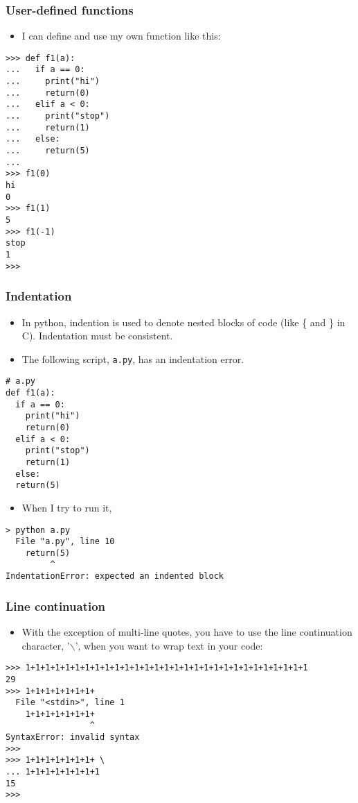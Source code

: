 \documentclass[handout]{beamer}
\numberwithin{equation}{section}
\begin{document}
\begin{frame}[fragile]
\frametitle{User-defined functions}

\begin{itemize}
\item I can define and use my own function like this:
\end{itemize}

\begin{lstlisting}[name=ex]
>>> def f1(a):
...   if a == 0:
...     print("hi")
...     return(0)
...   elif a < 0:
...     print("stop")
...     return(1)
...   else:
...     return(5)
... 
>>> f1(0)
hi
0
>>> f1(1)
5
>>> f1(-1)
stop
1
>>> 
\end{lstlisting}
\end{frame}




\begin{frame}[fragile]
\frametitle{Indentation}

\begin{itemize}
\item In python, indention is used to denote nested blocks of code (like \{ and \} in C). Indentation must be consistent. 
\pause \item The following script, {\tt a.py}, has an indentation error.
\end{itemize}

\begin{lstlisting}[name=ex]
# a.py
def f1(a):
  if a == 0:
    print("hi")
    return(0)
  elif a < 0:
    print("stop")
    return(1)
  else:
  return(5)
\end{lstlisting}

\pause
\begin{itemize}
\item When I try to run it,
\end{itemize}

\begin{lstlisting}[name=ex]
> python a.py
  File "a.py", line 10
    return(5)
         ^
IndentationError: expected an indented block
\end{lstlisting}
\end{frame}







\begin{frame}[fragile]
\frametitle{Line continuation}

\begin{itemize}
\item With the exception of multi-line quotes, you have to use the line continuation character, '$\backslash$', when you want to wrap text in your code:
\end{itemize}

\begin{lstlisting}[name=ex]
>>> 1+1+1+1+1+1+1+1+1+1+1+1+1+1+1+1+1+1+1+1+1+1+1+1+1+1+1+1+1
29
>>> 1+1+1+1+1+1+1+
  File "<stdin>", line 1
    1+1+1+1+1+1+1+
                 ^
SyntaxError: invalid syntax
>>>
>>> 1+1+1+1+1+1+1+ \
... 1+1+1+1+1+1+1+1
15
>>> 
\end{lstlisting}
\end{frame}
\end{document}
